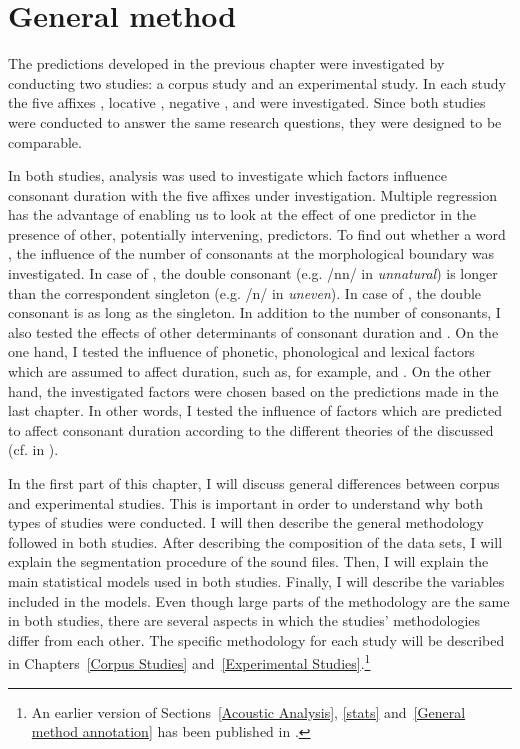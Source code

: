 \chapter{General method} \label{General Method}



The predictions developed in the previous chapter were investigated by conducting two studies: a corpus study and an experimental study. In each study the five affixes , locative , negative ,  and  were investigated. 
Since both studies were conducted to answer the same research questions, they were designed to be comparable.  

In both studies,  analysis was used to investigate which factors influence consonant duration with the five affixes under investigation. Multiple regression has the advantage of enabling us to look at the effect of one predictor in the presence of other, potentially intervening, predictors.  
To find out whether a word , the influence of the number of consonants at the morphological boundary was investigated. In case of , the double consonant (e.g. /nn/ in \textit{unnatural}) is longer than the correspondent singleton (e.g. /n/ in \textit{uneven}). In case of , the double consonant is as long as the singleton. In addition to the number of consonants, I also tested the effects of other determinants of consonant duration and . On the one hand, I tested the influence of phonetic, phonological and lexical factors which are assumed to affect duration, such as, for example,  and . On the other hand, the investigated factors were chosen based on the predictions made in the last chapter. In other words, I tested the influence of factors which are predicted to affect consonant duration according to the different theories of the  discussed (cf.  in ). 




In the first part of this chapter, I will discuss general differences between corpus and experimental studies. This is important in order to understand why both types of studies were conducted. I will then describe the general methodology followed in both studies. After describing the composition of the data sets, I will explain the segmentation procedure of the sound files. Then, I will explain the main statistical models used in both studies. Finally, I will describe the variables included in the models.
Even though large parts of the methodology are the same in both studies, there are several aspects in which the studies' methodologies differ from each other. The specific methodology for each study will be described in Chapters~\ref{Corpus Studies} and~\ref{Experimental Studies}.\footnote{An earlier version of Sections~\ref{Acoustic Analysis}, \ref{stats}  and~\ref{General method annotation} has been published in \cite{BenHedia.2017}.}


